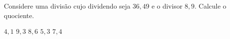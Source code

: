 Considere uma divisão cujo dividendo seja $36{,}49$ e o divisor $8{,}9$. Calcule o quociente.

$4{,}1$
$9{,}3$
$8{,}6$
$5{,}3$
$7{,}4$



